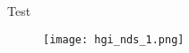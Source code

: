 \documentclass{article}
\begin{document}
Test
\begin{figure}
\centering
\texttt{[image: hgi\_nds\_1.png]} 
\label{fig:1}
\end{figure}
\end{document}
